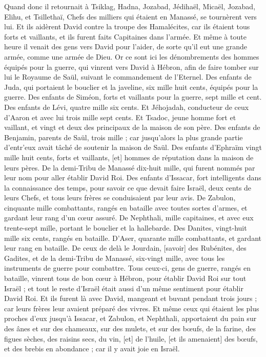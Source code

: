 \begin{multicols}{2}
Quand donc il retournait à Tsiklag, Hadna, Jozabad, Jédihaël, Micaël, Jozabad, Elihu, et Tsillethaï, Chefs des milliers qui étaient en Manassé, se tournèrent vers lui.
Et ils aidèrent David contre la troupe des Hamalécites, car ils étaient tous forts et vaillants, et ils furent faits Capitaines dans l'armée.
Et même à toute heure il venait des gens vers David pour l'aider, de sorte qu'il eut une grande armée, comme une armée de Dieu.
Or ce sont ici les dénombrements des hommes équipés pour la guerre, qui vinrent vers David à Hébron, afin de faire tomber sur lui le Royaume de Saül, suivant le commandement de l'Eternel.
Des enfants de Juda, qui portaient le bouclier et la javeline, six mille huit cents, équipés pour la guerre.
Des enfants de Siméon, forts et vaillants pour la guerre, sept mille et cent.
Des enfants de Lévi, quatre mille six cents.
Et Jéhojadah, conducteur de ceux d'Aaron et avec lui trois mille sept cents.
Et Tsadoc, jeune homme fort et vaillant, et vingt et deux des principaux de la maison de son père.
Des enfants de Benjamin, parents de Saül, trois mille ; car jusqu'alors la plus grande partie d'entr'eux avait tâché de soutenir la maison de Saül.
Des enfants d'Ephraïm vingt mille huit cents, forts et vaillants, [et] hommes de réputation dans la maison de leurs pères.
De la demi-Tribu de Manassé dix-huit mille, qui furent nommés par leur nom pour aller établir David Roi.
Des enfants d'Issacar, fort intelligents dans la connaissance des temps, pour savoir ce que devait faire Israël, deux cents de leurs Chefs, et tous leurs frères se conduisaient par leur avis.
De Zabulon, cinquante mille combattants, rangés en bataille avec toutes sortes d'armes, et gardant leur rang d'un cœur assuré.
De Nephthali, mille capitaines, et avec eux trente-sept mille, portant le bouclier et la hallebarde.
Des Danites, vingt-huit mille six cents, rangés en bataille.
D'Aser, quarante mille combattants, et gardant leur rang en bataille.
De ceux de delà le Jourdain, [savoir] des Rubénites, des Gadites, et de la demi-Tribu de Manassé, six-vingt mille, avec tous les instruments de guerre pour combattre.
Tous ceux-ci, gens de guerre, rangés en bataille, vinrent tous de bon cœur à Hébron, pour établir David Roi sur tout Israël ; et tout le reste d'Israël était aussi d'un même sentiment pour établir David Roi.
Et ils furent là avec David, mangeant et buvant pendant trois jours ; car leurs frères leur avaient préparé des vivres.
Et même ceux qui étaient les plus proches d'eux jusqu'à Issacar, et Zabulon, et Nephthali, apportaient du pain sur des ânes et sur des chameaux, sur des mulets, et sur des bœufs, de la farine, des figues sèches, des raisins secs, du vin, [et] de l'huile, [et ils amenaient] des bœufs, et des brebis en abondance ; car il y avait joie en Israël.

\end{multicols}
